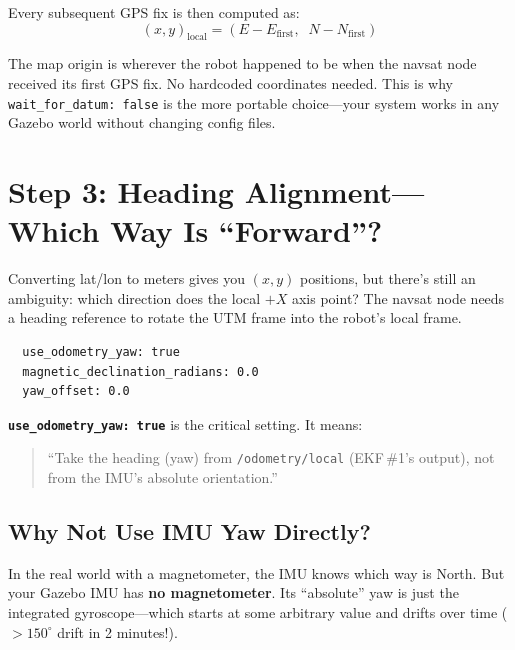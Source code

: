 \documentclass[11pt,a4paper]{article}
\begin{document}
Every subsequent GPS fix is then computed as:
\begin{equation}
  (x, y)_{\text{local}} = (E - E_{\text{first}},\;\; N - N_{\text{first}})
\end{equation}

\begin{keyidea}
The map origin is wherever the robot happened to be when the navsat node
received its first GPS fix. No hardcoded coordinates needed. This is why
\texttt{wait\_for\_datum: false} is the more portable choice---your system
works in any Gazebo world without changing config files.
\end{keyidea}

\section{Step 3: Heading Alignment---Which Way Is ``Forward''?}

Converting lat/lon to meters gives you $(x, y)$ positions, but there's still
an ambiguity: which direction does the local $+X$ axis point? The navsat node
needs a heading reference to rotate the UTM frame into the robot's local frame.

\begin{config}
\begin{verbatim}
  use_odometry_yaw: true
  magnetic_declination_radians: 0.0
  yaw_offset: 0.0
\end{verbatim}
\end{config}

\noindent\textbf{\texttt{use\_odometry\_yaw: true}} is the critical setting. It means:

\begin{quote}
``Take the heading (yaw) from \texttt{/odometry/local} (EKF\,\#1's output),
not from the IMU's absolute orientation.''
\end{quote}

\subsection{Why Not Use IMU Yaw Directly?}

In the real world with a magnetometer, the IMU knows which way is North. But
your Gazebo IMU has \textbf{no magnetometer}. Its ``absolute'' yaw is just the
integrated gyroscope---which starts at some arbitrary value and drifts over
time ($> 150^\circ$ drift in 2 minutes!).
\end{document}
